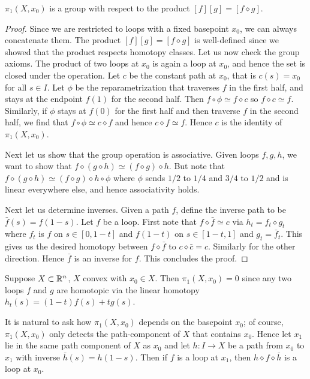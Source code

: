 \documentclass{../mathnotes}
\begin{document}
\begin{prop}
    $\pi_1(X,x_0)$ is a group with respect to the product $[f][g]=[f\diamond g]$.
\end{prop}
\begin{proof}
    Since we are restricted to loops with a fixed basepoint $x_0$, we can always concatenate them.
    The product $[f][g]=[f\diamond g]$ is well-defined since we showed that the product respects
    homotopy classes. Let us now check the group axioms. The product of two loops at $x_0$ is
    again a loop at $x_0$, and hence the set is closed under the operation. Let $c$ be the
    constant path at $x_0$, that is $c(s)=x_0$ for all $s\in I$. Let $\phi$ be the reparametrization
    that traverses $f$ in the first half, and stays at the endpoint $f(1)$ for the second half.
    Then $f\circ\phi\simeq f\diamond c$ so $f\diamond c\simeq f$. Similarly, if $\phi$ stays at $f(0)$
    for the first half and then traverse $f$ in the second half, we find that $f\circ\phi\simeq c\diamond f$
    and hence $c\diamond f\simeq f$. Hence $c$ is the identity of $\pi_1(X,x_0)$.

    Next let us show that the group operation is associative. Given loops $f,g,h$, we want to show that
    $f\diamond(g\diamond h)\simeq (f\diamond g)\diamond h$. But note that
    $f\diamond(g\diamond h)\simeq (f\diamond g)\diamond h\circ\phi$
    where $\phi$ sends $1/2$ to $1/4$ and $3/4$ to $1/2$ and is linear everywhere else, and hence
    associativity holds.

    Next let us determine inverses. Given a path $f$, define the inverse path to be $\bar f(s)=f(1-s)$.
    Let $f$ be a loop.  First note that $f\diamond\bar f\simeq c$ via $h_t=f_t\diamond g_t$ where
    $f_t$ is $f$ on $s\in[0,1-t]$ and $f(1-t)$ on $s\in[1-t,1]$ and $g_t=\bar f_{t}$. This gives us
    the desired homotopy between $f\diamond\bar f$ to $c\diamond\bar c=c$. Similarly for the other direction.
    Hence $\bar f$ is an inverse for $f$. This concludes the proof.
\end{proof}

\begin{exmp}
    Suppose $X\subset\mathbb{R}^n$, $X$ convex with $x_0\in X$. Then $\pi_1(X,x_0)=0$ since any two loops
    $f$ and $g$ are homotopic via the linear homotopy $h_t(s)=(1-t)f(s)+tg(s)$.
\end{exmp}

It is natural to ask how $\pi_1(X,x_0)$ depends on the basepoint $x_0$; of course, $\pi_1(X,x_0)$ only
detects the path-component of $X$ that contains $x_0$. Hence let $x_1$ lie in the same path component of
$X$ as $x_0$ and let $h:I\to X$ be a path from $x_0$ to $x_1$ with inverse $\bar h(s)=h(1-s)$. Then if $f$
is a loop at $x_1$, then $h\diamond f\diamond \bar h$ is a loop at $x_0$.
\end{document}
